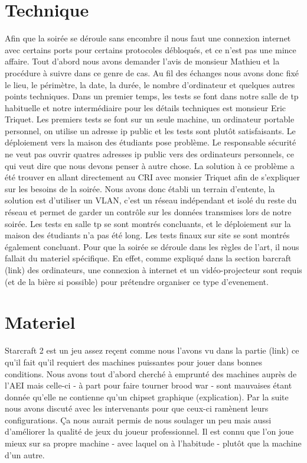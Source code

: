 \section{Technique}%
\label{sec:technique}

Afin que la soirée se déroule sans encombre il nous faut une connexion
internet avec certains ports pour certains protocoles débloqués, et ce
n'est pas une mince affaire. Tout d'abord nous avons demander l'avis de
monsieur Mathieu et la procédure à suivre dans ce genre de cas.  Au fil
des échanges nous avons donc fixé le lieu, le périmètre, la date, la
durée, le nombre d'ordinateur et quelques autres points techniques.
Dans un premier temps, les tests se font dans notre salle de tp
habituelle et notre intermédiaire pour les détails techniques est
monsieur Eric Triquet.  Les premiers tests se font sur un seule machine,
un ordinateur portable personnel, on utilise un adresse ip public et les
tests sont plutôt satisfaisants.  Le déploiement vers la maison des
étudiants pose problème. Le responsable sécurité ne veut pas ouvrir
quatres adresses ip public vers des ordinateurs personnels, ce qui veut
dire que nous devons penser à autre chose.  La solution à ce problème a
été trouver en allant directement au CRI avec monsier Triquet afin de
s'expliquer sur les besoins de la soirée.  Nous avons donc établi un
terrain d'entente, la solution est d'utiliser un VLAN, c'est un réseau
indépendant et isolé du reste du réseau et permet de garder un contrôle
sur les données transmises lors de notre soirée.  Les tests en salle tp
se sont montrés concluants, et le déploiement sur la maison des
étudiants n'a pas été long.  Les tests finaux sur site se sont montrés
également concluant.
Pour que la soirée se déroule dans les règles de l'art, il nous fallait
du materiel spécifique. En effet, comme expliqué dans la section
barcraft (link) des ordinateurs, une connexion à internet et un
vidéo-projecteur sont requis (et de la bière si possible) pour prétendre
organiser ce type d'evenement.

\section{Materiel}%
\label{sec:materiel}

  Starcraft 2 est un jeu assez reçent comme nous l'avons vu dans la
partie (link) ce qu'il fait qu'il requiert des machines puissantes pour jouer
dans bonnes conditions. Nous avons tout d'abord cherché à emprunté des
machines auprès de l'AEI mais celle-ci - à part pour faire tourner brood
war - sont mauvaises étant donnée qu'elle ne contienne qu'un chipset
graphique (explication). Par la suite nous avons discuté avec les
intervenants pour que ceux-ci ramènent leurs configurations. Ça nous
aurait permis de nous soulager un peu mais aussi d'améliorer la qualité
de jeux du joueur professionnel. Il est connu que l'on joue mieux sur sa
propre machine - avec laquel on à l'habitude - plutôt que la machine d'un
autre.

